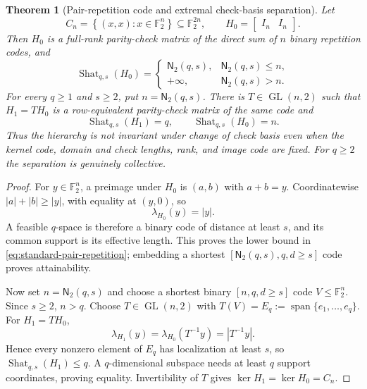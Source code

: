 \documentclass[10pt,a4paper]{amsart}
\newtheorem{theorem}{Theorem}
\newcommand{\F}{\mathbb{F}_2}
\newcommand{\Shat}{\operatorname{Shat}}
\newcommand{\abs}[1]{\left|#1\right|}
\newcommand{\set}[1]{\left\{#1\right\}}
\begin{document}
\begin{theorem}[Pair-repetition code and extremal check-basis separation]
\label{thm:check-basis-separation}
Let
\[
 C_n=\set{(x,x):x\in\F^n}\subseteq\F^{2n},
 \qquad H_0=\begin{bmatrix}I_n&I_n\end{bmatrix}.
\]
Then $H_0$ is a full-rank parity-check matrix of the direct sum of $n$
binary repetition codes, and
\begin{equation}\label{eq:standard-pair-repetition}
 \Shat_{q,s}(H_0)=
 \begin{cases}
 \mathsf N_2(q,s),&\mathsf N_2(q,s)\le n,\\
 +\infty,&\mathsf N_2(q,s)>n.
 \end{cases}
\end{equation}
For every $q\ge1$ and $s\ge2$, put $n=\mathsf N_2(q,s)$.  There is
$T\in\operatorname{GL}(n,2)$ such that $H_1=TH_0$ is a row-equivalent
parity-check matrix of the same code and
\begin{equation}\label{eq:check-basis-gap}
 \Shat_{q,s}(H_1)=q,
 \qquad \Shat_{q,s}(H_0)=n.
\end{equation}
Thus the hierarchy is not invariant under change of check basis even when the
kernel code, domain and check lengths, rank, and image code are fixed.  For
$q\ge2$ the separation is genuinely collective.
\end{theorem}

\begin{proof}
For $y\in\F^n$, a preimage under $H_0$ is $(a,b)$ with $a+b=y$.
Coordinatewise $\abs a+\abs b\ge\abs y$, with equality at $(y,0)$, so
\begin{equation}\label{eq:H0-lambda}
 \lambda_{H_0}(y)=\abs y.
\end{equation}
A feasible $q$-space is therefore a binary code of distance at least $s$, and
its common support is its effective length.  This proves the lower bound in
\eqref{eq:standard-pair-repetition}; embedding a shortest
$[\mathsf N_2(q,s),q,d\ge s]$ code proves attainability.

Now set $n=\mathsf N_2(q,s)$ and choose a shortest binary $[n,q,d\ge s]$
code $V\le\F^n$.  Since $s\ge2$, $n>q$.  Choose
$T\in\operatorname{GL}(n,2)$ with
$T(V)=E_q:=\operatorname{span}\{e_1,\ldots,e_q\}$.  For $H_1=TH_0$,
\[
 \lambda_{H_1}(y)=\lambda_{H_0}(T^{-1}y)=\abs{T^{-1}y}.
\]
Hence every nonzero element of $E_q$ has localization at least $s$, so
$\Shat_{q,s}(H_1)\le q$.  A $q$-dimensional subspace needs at least $q$
support coordinates, proving equality.  Invertibility of $T$ gives
$\ker H_1=\ker H_0=C_n$.
\end{proof}
\end{document}
